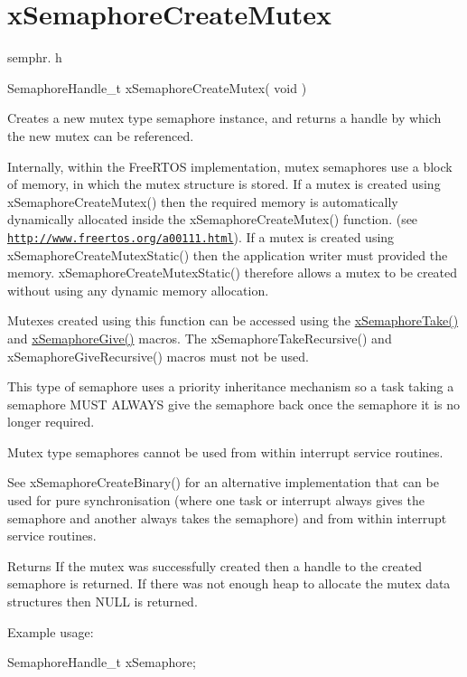\hypertarget{group__xSemaphoreCreateMutex}{}\section{x\+Semaphore\+Create\+Mutex}
\label{group__xSemaphoreCreateMutex}
semphr. h 
\begin{DoxyPre}SemaphoreHandle\_t xSemaphoreCreateMutex( void )\end{DoxyPre}


Creates a new mutex type semaphore instance, and returns a handle by which the new mutex can be referenced.

Internally, within the Free\+R\+T\+OS implementation, mutex semaphores use a block of memory, in which the mutex structure is stored. If a mutex is created using x\+Semaphore\+Create\+Mutex() then the required memory is automatically dynamically allocated inside the x\+Semaphore\+Create\+Mutex() function. (see \href{http://www.freertos.org/a00111.html}{\tt http\+://www.\+freertos.\+org/a00111.\+html}). If a mutex is created using x\+Semaphore\+Create\+Mutex\+Static() then the application writer must provided the memory. x\+Semaphore\+Create\+Mutex\+Static() therefore allows a mutex to be created without using any dynamic memory allocation.

Mutexes created using this function can be accessed using the \hyperlink{semphr_8h_af116e436d2a5ae5bd72dbade2b5ea930}{x\+Semaphore\+Take()} and \hyperlink{semphr_8h_aae55761cabfa9bf85c8f4430f78c0953}{x\+Semaphore\+Give()} macros. The x\+Semaphore\+Take\+Recursive() and x\+Semaphore\+Give\+Recursive() macros must not be used.

This type of semaphore uses a priority inheritance mechanism so a task \textquotesingle{}taking\textquotesingle{} a semaphore M\+U\+ST A\+L\+W\+A\+YS \textquotesingle{}give\textquotesingle{} the semaphore back once the semaphore it is no longer required.

Mutex type semaphores cannot be used from within interrupt service routines.

See x\+Semaphore\+Create\+Binary() for an alternative implementation that can be used for pure synchronisation (where one task or interrupt always \textquotesingle{}gives\textquotesingle{} the semaphore and another always \textquotesingle{}takes\textquotesingle{} the semaphore) and from within interrupt service routines.

\begin{DoxyReturn}{Returns}
If the mutex was successfully created then a handle to the created semaphore is returned. If there was not enough heap to allocate the mutex data structures then N\+U\+LL is returned.
\end{DoxyReturn}
Example usage\+: 
\begin{DoxyPre}
SemaphoreHandle\_t xSemaphore;\end{DoxyPre}



